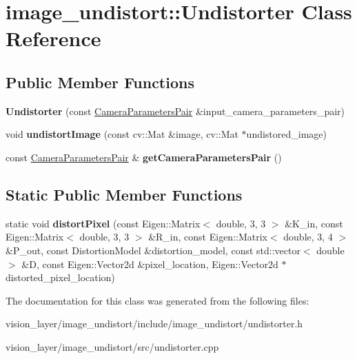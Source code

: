 \hypertarget{classimage__undistort_1_1Undistorter}{}\section{image\+\_\+undistort\+:\+:Undistorter Class Reference}
\label{classimage__undistort_1_1Undistorter}
\subsection*{Public Member Functions}
\begin{DoxyCompactItemize}
\item 
\mbox{\label{classimage__undistort_1_1Undistorter_a9a53098324f417c918d1fcd8bcaa7baf}} 
{\bfseries Undistorter} (const \hyperlink{classimage__undistort_1_1CameraParametersPair}{Camera\+Parameters\+Pair} \&input\+\_\+camera\+\_\+parameters\+\_\+pair)
\item 
\mbox{\label{classimage__undistort_1_1Undistorter_a22e36d3e5dd830a3e634b8f2e1a7c5eb}} 
void {\bfseries undistort\+Image} (const cv\+::\+Mat \&image, cv\+::\+Mat $\ast$undistored\+\_\+image)
\item 
\mbox{\label{classimage__undistort_1_1Undistorter_a5848d83f7009609fb88ff79492d57781}} 
const \hyperlink{classimage__undistort_1_1CameraParametersPair}{Camera\+Parameters\+Pair} \& {\bfseries get\+Camera\+Parameters\+Pair} ()
\end{DoxyCompactItemize}
\subsection*{Static Public Member Functions}
\begin{DoxyCompactItemize}
\item 
\mbox{\label{classimage__undistort_1_1Undistorter_a370f6ac944bfee99f3736d7e3fbb9ba9}} 
static void {\bfseries distort\+Pixel} (const Eigen\+::\+Matrix$<$ double, 3, 3 $>$ \&K\+\_\+in, const Eigen\+::\+Matrix$<$ double, 3, 3 $>$ \&R\+\_\+in, const Eigen\+::\+Matrix$<$ double, 3, 4 $>$ \&P\+\_\+out, const Distortion\+Model \&distortion\+\_\+model, const std\+::vector$<$ double $>$ \&D, const Eigen\+::\+Vector2d \&pixel\+\_\+location, Eigen\+::\+Vector2d $\ast$distorted\+\_\+pixel\+\_\+location)
\end{DoxyCompactItemize}


The documentation for this class was generated from the following files\+:\begin{DoxyCompactItemize}
\item 
vision\+\_\+layer/image\+\_\+undistort/include/image\+\_\+undistort/undistorter.\+h\item 
vision\+\_\+layer/image\+\_\+undistort/src/undistorter.\+cpp\end{DoxyCompactItemize}
